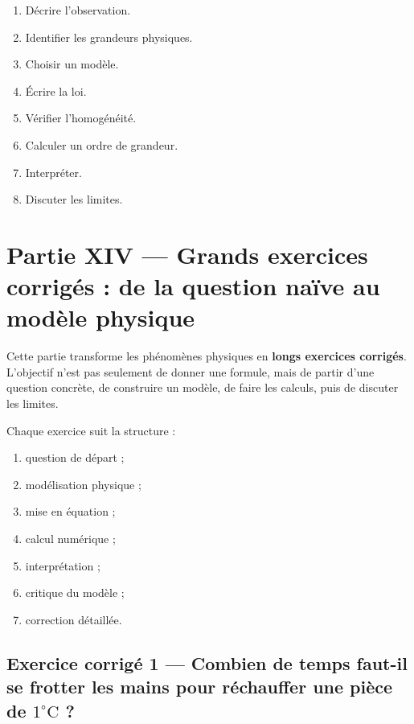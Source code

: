 \documentclass[11pt,a4paper]{article}
\begin{document}
\begin{methodebox}
\begin{enumerate}
  \item Décrire l'observation.
  \item Identifier les grandeurs physiques.
  \item Choisir un modèle.
  \item Écrire la loi.
  \item Vérifier l'homogénéité.
  \item Calculer un ordre de grandeur.
  \item Interpréter.
  \item Discuter les limites.
\end{enumerate}
\end{methodebox}


\section{Partie XIV — Grands exercices corrigés : de la question naïve au modèle physique}

\begin{attentionbox}
Cette partie transforme les phénomènes physiques en \textbf{longs exercices corrigés}. L'objectif n'est pas seulement de donner une formule, mais de partir d'une question concrète, de construire un modèle, de faire les calculs, puis de discuter les limites. 

Chaque exercice suit la structure :
\begin{enumerate}
  \item question de départ ;
  \item modélisation physique ;
  \item mise en équation ;
  \item calcul numérique ;
  \item interprétation ;
  \item critique du modèle ;
  \item correction détaillée.
\end{enumerate}
\end{attentionbox}

\subsection{Exercice corrigé 1 — Combien de temps faut-il se frotter les mains pour réchauffer une pièce de \(1^\circ\mathrm C\) ?}
\end{document}
